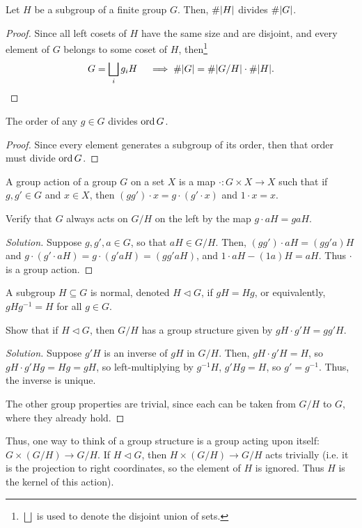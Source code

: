 \begin{thm}
Let $H$ be a subgroup of a finite group $G$. Then, $\#|H|$ divides $\#|G|$.
\end{thm}
\begin{proof}
Since all left cosets of $H$ have the same size and are disjoint, and every element of $G$ belongs to some coset of $H$, then\footnote{$\bigsqcup$ is used to denote the disjoint union of sets.}
\[G = \bigsqcup_i g_iH \quad \implies \#|G| = \#|G/H|\cdot \#|H|.\qedhere\]
\end{proof}
\begin{cor}[Lagrange]
The order of any $g\in G$ divides $\operatorname{ord} G$.
\end{cor}
\begin{proof}
Since every element generates a subgroup of its order, then that order must divide $\operatorname{ord} G$.
\end{proof}
\begin{defn}
A group action of a group $G$ on a set $X$ is a map $\cdot: G\times X\to X$ such that if $g,g'\in G$ and $x\in X$, then $(gg')\cdot x = g\cdot (g'\cdot x)$ and $1\cdot x = x$.
\end{defn}
\begin{ex}
Verify that $G$ always acts on $G/H$ on the left by the map $g\cdot aH = gaH$.
\end{ex}
\begin{proof}[Solution]
Suppose $g,g',a\in G$, so that $aH \in G/H$. Then, $(gg')\cdot aH = (gg'a)H$ and $g\cdot(g'\cdot aH) = g\cdot(g'aH) = (gg'aH)$, and $1\cdot aH - (1a)H = aH$. Thus $\cdot$ is a group action.
\end{proof}
\begin{defn}
A subgroup $H\subseteq G$ is normal, denoted $H \!\vartriangleleft G$, if $gH = Hg$, or equivalently, $gHg^{-1} = H$ for all $g\in G$.
\end{defn}
\begin{ex}
Show that if $H\!\vartriangleleft G$, then $G/H$ has a group structure given by $gH \cdot g'H = gg'H$.
\end{ex}
\begin{proof}[Solution]
Suppose $g'H$ is an inverse of $gH$ in $G/H$. Then, $gH\cdot g'H = H$, so $gH\cdot g'Hg = Hg = gH$, so left-multiplying by $g^{-1}H$, $g'Hg = H$, so $g' = g^{-1}$. Thus, the inverse is unique.

The other group properties are trivial, since each can be taken from $G/H$ to $G$, where they already hold.
\end{proof}
Thus, one way to think of a group structure is a group acting upon itself: $G\times (G/H) \to G/H$. If $H\!\vartriangleleft G$, then $H \times (G/H) \to G/H$ acts trivially (i.e. it is the projection to right coordinates, so the element of $H$ is ignored. Thus $H$ is the kernel of this action).
